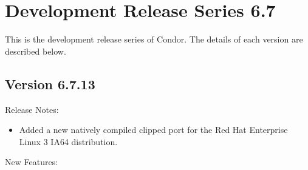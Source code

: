 \section{\label{sec:History-6-7}Development Release Series 6.7}

This is the development release series of Condor.
The details of each version are described below.

\subsection*{\label{sec:New-6-7.13}Version 6.7.13}

\noindent Release Notes:

\begin{itemize}

\item Added a new natively compiled clipped port for the Red Hat
Enterprise Linux 3 IA64 distribution.

\end{itemize}

\noindent New Features:


